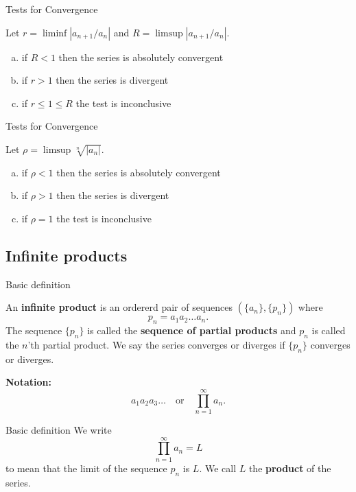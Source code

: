 \documentclass{beamer}
\begin{document}
\begin{frame}{Tests for Convergence}
\begin{thm}
Let $r = \liminf |a_{n+1}/a_n|$ and $R = \limsup |a_{n+1}/a_n|$.
\begin{enumerate}[(a)]
\item if $R < 1$ then the series is absolutely convergent
\item if $r > 1$ then the series is divergent
\item if $r \leq 1\leq R$ the test is inconclusive
\end{enumerate}
\end{thm}
\end{frame}

\begin{frame}{Tests for Convergence}
\begin{thm}
Let $\rho = \limsup \sqrt[n]{|a_n|}$.
\begin{enumerate}[(a)]
\item if $\rho < 1$ then the series is absolutely convergent
\item if $\rho > 1$ then the series is divergent
\item if $\rho = 1$ the test is inconclusive
\end{enumerate}
\end{thm}
\end{frame}

\subsection{Infinite products}

\begin{frame}{Basic definition}
\begin{defn}
An \textbf{infinite product} is an ordererd pair of sequences $(\{a_n\},\{p_n\})$ where 
$$p_n = a_1a_2\dots a_n.$$
The sequence $\{p_n\}$ is called the \textbf{sequence of partial products} and $p_n$ is called the $n$'th partial product.
We say the series converges or diverges if $\{p_n\}$ converges or diverges.
\end{defn}
\textbf{Notation:}
$$a_1a_2a_3\dots\quad\text{or}\quad \prod_{n=1}^\infty a_n.$$
\end{frame}

\begin{frame}{Basic definition}
We write
$$\prod_{n=1}^\infty a_n = L$$
to mean that the limit of the sequence $p_n$ is $L$.
We call $L$ the \textbf{product} of the series.
\end{frame}
\end{document}
